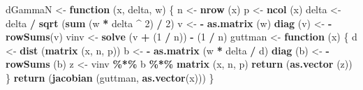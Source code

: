 \documentclass[
  12pt,
]{article}
\newenvironment{Shaded}{\begin{snugshade}}{\end{snugshade}}
\newcommand{\ControlFlowTok}[1]{\textcolor[rgb]{0.13,0.29,0.53}{\textbf{#1}}}
\newcommand{\DecValTok}[1]{\textcolor[rgb]{0.00,0.00,0.81}{#1}}
\newcommand{\FunctionTok}[1]{\textcolor[rgb]{0.13,0.29,0.53}{\textbf{#1}}}
\newcommand{\NormalTok}[1]{#1}
\newcommand{\OtherTok}[1]{\textcolor[rgb]{0.56,0.35,0.01}{#1}}
\newcommand{\SpecialCharTok}[1]{\textcolor[rgb]{0.81,0.36,0.00}{\textbf{#1}}}
\begin{document}
\begin{Shaded}
\begin{Highlighting}[]
\NormalTok{dGammaN }\OtherTok{\textless{}{-}} \ControlFlowTok{function}\NormalTok{ (x, delta, w) \{}
\NormalTok{  n }\OtherTok{\textless{}{-}} \FunctionTok{nrow}\NormalTok{ (x)}
\NormalTok{  p }\OtherTok{\textless{}{-}} \FunctionTok{ncol}\NormalTok{ (x)}
\NormalTok{  delta }\OtherTok{\textless{}{-}}\NormalTok{ delta }\SpecialCharTok{/} \FunctionTok{sqrt}\NormalTok{ (}\FunctionTok{sum}\NormalTok{ (w }\SpecialCharTok{*}\NormalTok{ delta }\SpecialCharTok{\^{}} \DecValTok{2}\NormalTok{) }\SpecialCharTok{/} \DecValTok{2}\NormalTok{)}
\NormalTok{  v }\OtherTok{\textless{}{-}} \SpecialCharTok{{-}} \FunctionTok{as.matrix}\NormalTok{ (w)}
  \FunctionTok{diag}\NormalTok{ (v) }\OtherTok{\textless{}{-}} \SpecialCharTok{{-}} \FunctionTok{rowSums}\NormalTok{(v)}
\NormalTok{  vinv }\OtherTok{\textless{}{-}} \FunctionTok{solve}\NormalTok{ (v }\SpecialCharTok{+}\NormalTok{ (}\DecValTok{1} \SpecialCharTok{/}\NormalTok{ n)) }\SpecialCharTok{{-}}\NormalTok{ (}\DecValTok{1} \SpecialCharTok{/}\NormalTok{ n)}
\NormalTok{  guttman }\OtherTok{\textless{}{-}} \ControlFlowTok{function}\NormalTok{ (x) \{}
\NormalTok{    d }\OtherTok{\textless{}{-}} \FunctionTok{dist}\NormalTok{ (}\FunctionTok{matrix}\NormalTok{ (x, n, p))}
\NormalTok{    b }\OtherTok{\textless{}{-}} \SpecialCharTok{{-}} \FunctionTok{as.matrix}\NormalTok{ (w }\SpecialCharTok{*}\NormalTok{ delta }\SpecialCharTok{/}\NormalTok{ d)}
    \FunctionTok{diag}\NormalTok{ (b) }\OtherTok{\textless{}{-}} \SpecialCharTok{{-}} \FunctionTok{rowSums}\NormalTok{ (b)}
\NormalTok{    z }\OtherTok{\textless{}{-}}\NormalTok{ vinv }\SpecialCharTok{\%*\%}\NormalTok{ b }\SpecialCharTok{\%*\%} \FunctionTok{matrix}\NormalTok{ (x, n, p)}
    \FunctionTok{return}\NormalTok{ (}\FunctionTok{as.vector}\NormalTok{ (z))}
\NormalTok{  \}}
  \FunctionTok{return}\NormalTok{ (}\FunctionTok{jacobian}\NormalTok{ (guttman, }\FunctionTok{as.vector}\NormalTok{(x)))}
\NormalTok{\}}


\end{Highlighting}
\end{Shaded}
\end{document}
